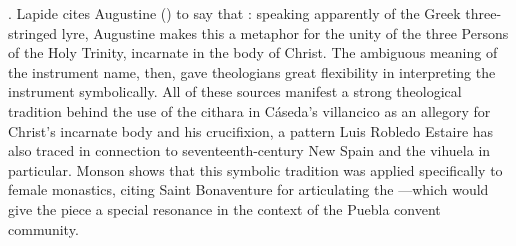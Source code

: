 .%
    \Autocite[370]{Lapide:1Samuel}
Lapide cites Augustine () to say that : speaking apparently of the Greek
three-stringed lyre, Augustine makes this a metaphor for the unity of the three
Persons of the Holy Trinity, incarnate in the body of Christ.%
    \Autocite[370]{Lapide:1Samuel}
The ambiguous meaning of the instrument name, then, gave theologians great
flexibility in interpreting the instrument symbolically.
All of these sources manifest a strong theological tradition behind the use of
the cithara in Cáseda's villancico as an allegory for Christ's incarnate body
and his crucifixion, a pattern Luis Robledo Estaire has also traced in
connection to seventeenth-century New Spain and the vihuela in particular.%
    \Autocite{Robledo:CruzInstrumentos}
Monson shows that this symbolic tradition was applied specifically to female
monastics, citing Saint Bonaventure for articulating the ---which
would give the piece a special resonance in the context of the Puebla convent
community.%
    \Autocites
    [93--94]{Monson:DivasConvent}
    [see also][]{Ocana:AmoresHumanos}


